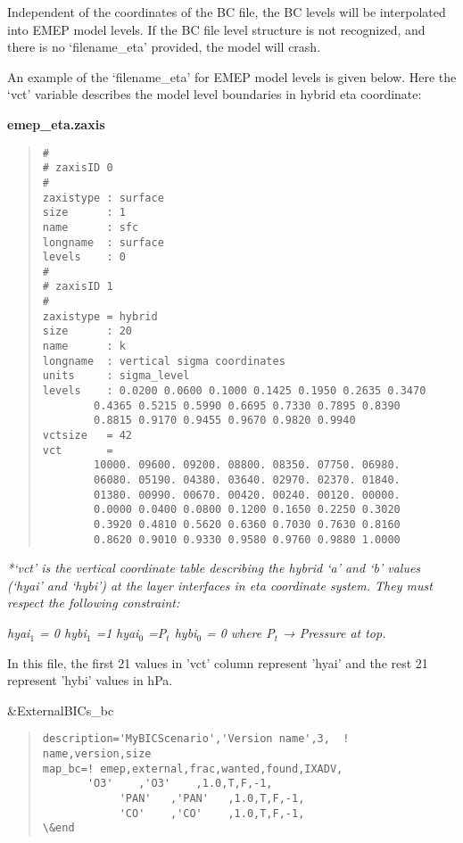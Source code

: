 Independent of the coordinates of the BC file, the BC levels will be interpolated into EMEP model levels.  If the BC file level structure is not recognized, and there 	is no `filename\_eta' provided, the model will crash. 

An example of the `filename\_eta' for EMEP model levels is given below. Here the `vct' variable describes the model level boundaries in hybrid eta coordinate: 	

{\bf emep\_eta.zaxis}
\begin{quote}
\begin{verbatim}
# 
# zaxisID 0 
# 
zaxistype : surface 
size      : 1 
name      : sfc 
longname  : surface 
levels    : 0 
# 
# zaxisID 1 
# 
zaxistype = hybrid 
size      : 20 
name      : k 
longname  : vertical sigma coordinates 
units     : sigma_level 
levels    : 0.0200 0.0600 0.1000 0.1425 0.1950 0.2635 0.3470 
	    0.4365 0.5215 0.5990 0.6695 0.7330 0.7895 0.8390 
	    0.8815 0.9170 0.9455 0.9670 0.9820 0.9940 
vctsize   = 42 
vct       =
	    10000. 09600. 09200. 08800. 08350. 07750. 06980. 
	    06080. 05190. 04380. 03640. 02970. 02370. 01840. 
	    01380. 00990. 00670. 00420. 00240. 00120. 00000. 
	    0.0000 0.0400 0.0800 0.1200 0.1650 0.2250 0.3020 
	    0.3920 0.4810 0.5620 0.6360 0.7030 0.7630 0.8160 
	    0.8620 0.9010 0.9330 0.9580 0.9760 0.9880 1.0000 
\end{verbatim}
\end{quote}


\textit {*`vct' is the vertical coordinate table describing the hybrid `a' and `b' values (`hyai' and `hybi') at the layer interfaces in eta coordinate system.  They must respect the following constraint:} 

\textit{hyai$_{1}$ = 0    hybi${_1}$ =1}
\newline
\textit{hyai${_0}$ =P${_t}$   hybi${_0}$ = 0}
\newline
\textit{where P${_t}$ → Pressure at top.}
\newline

In this file, the first 21 values in 'vct' column represent 'hyai' and the rest 21 represent 'hybi' values in hPa.  

\&ExternalBICs\_bc
\begin{quote}
\begin{verbatim}
description='MyBICScenario','Version name',3,  ! name,version,size 
map_bc=! emep,external,frac,wanted,found,IXADV, 
  	   'O3'    ,'O3'    ,1.0,T,F,-1, 
	      	'PAN'   ,'PAN'   ,1.0,T,F,-1, 
	      	'CO'    ,'CO'    ,1.0,T,F,-1, 
\&end 
\end{verbatim}
\end{quote}

